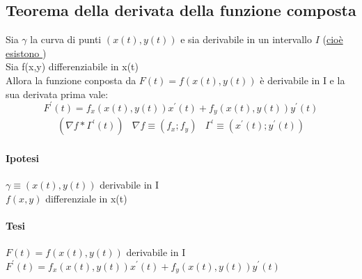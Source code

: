 \subsection{Teorema della derivata della funzione composta}
\begin{defi}
	Sia $\gamma$ la curva di punti $(x(t),y(t))$ e sia derivabile in un
	intervallo $I$ (\underline{cioè esistono })\\
	Sia f(x,y) differenziabile in x(t)\\
	Allora la funzione conposta da $F(t)=f(x(t),y(t))$ è derivabile in I e la
	sua derivata prima vale:
	\begin{equation}
		F^\prime (t)=f_x(x(t),y(t))x^\prime(t)+f_y(x(t),y(t))y^\prime(t)
	\end{equation}
	\begin{equation*}
		\begin{matrix}
			(\nabla f *\Gamma^\prime (t)) & \nabla f \equiv (f_x;f_y) &
			\Gamma^\prime \equiv(x^\prime (t); y^\prime (t))
		\end{matrix}
	\end{equation*}
	\begin{multicols}{2}
		\paragraph{Ipotesi}
			$\gamma \equiv (x(t),y(t))$ derivabile in I\\
			$f(x,y)$ differenziale in x(t)
		\paragraph{Tesi}
		$F(t)=f(x(t),y(t))$ derivabile in I\\
		$F^\prime(t)=f_x(x(t),y(t))x^\prime(t)+f_y(x(t),y(t))y^\prime (t)$
	\end{multicols}
\end{defi}
